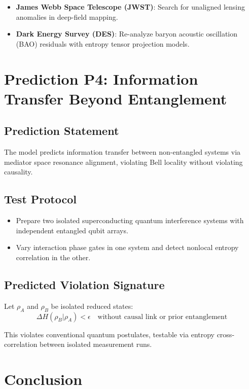 \documentclass[11pt]{article}
\begin{document}
\begin{itemize}
    \item \textbf{James Webb Space Telescope (JWST)}:
    Search for unaligned lensing anomalies in deep-field mapping.
    \item \textbf{Dark Energy Survey (DES)}:
    Re-analyze baryon acoustic oscillation (BAO) residuals with entropy tensor projection models.
\end{itemize}

\section{Prediction P4: Information Transfer Beyond Entanglement}

\subsection{Prediction Statement}

The model predicts information transfer between non-entangled systems via mediator space resonance alignment, violating Bell locality without violating causality.

\subsection{Test Protocol}

\begin{itemize}
    \item Prepare two isolated superconducting quantum interference systems with independent entangled qubit arrays.
    \item Vary interaction phase gates in one system and detect nonlocal entropy correlation in the other.
\end{itemize}

\subsection{Predicted Violation Signature}

Let \(\rho_A\) and \(\rho_B\) be isolated reduced states:
\[
\Delta H(\rho_B | \rho_A) < \epsilon \quad \text{without causal link or prior entanglement}
\]

This violates conventional quantum postulates, testable via entropy cross-correlation between isolated measurement runs.

\section{Conclusion}
\end{document}
